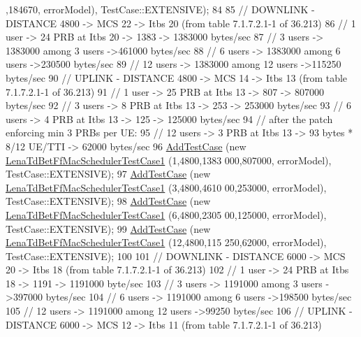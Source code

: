 \begin{DoxyCode}
      ,184670, errorModel), TestCase::EXTENSIVE);
84 
85   \textcolor{comment}{// DOWNLINK - DISTANCE 4800 -> MCS 22 -> Itbs 20 (from table 7.1.7.2.1-1 of 36.213)}
86   \textcolor{comment}{// 1 user -> 24 PRB at Itbs 20 -> 1383 -> 1383000 bytes/sec}
87   \textcolor{comment}{// 3 users -> 1383000 among 3 users ->461000  bytes/sec}
88   \textcolor{comment}{// 6 users -> 1383000 among 6 users ->230500  bytes/sec}
89   \textcolor{comment}{// 12 users -> 1383000 among 12 users ->115250  bytes/sec }
90   \textcolor{comment}{// UPLINK - DISTANCE 4800 -> MCS 14 -> Itbs 13 (from table 7.1.7.2.1-1 of 36.213)}
91   \textcolor{comment}{// 1 user -> 25 PRB at Itbs 13 -> 807 -> 807000 bytes/sec}
92   \textcolor{comment}{// 3 users -> 8 PRB at Itbs 13 -> 253 -> 253000 bytes/sec}
93   \textcolor{comment}{// 6 users -> 4 PRB at Itbs 13 -> 125 -> 125000 bytes/sec}
94   \textcolor{comment}{// after the patch enforcing min 3 PRBs per UE:}
95   \textcolor{comment}{// 12 users -> 3 PRB at Itbs 13 -> 93  bytes * 8/12 UE/TTI  -> 62000 bytes/sec}
96   \hyperlink{classns3_1_1TestCase_a3718088e3eefd5d6454569d2e0ddd835}{AddTestCase} (\textcolor{keyword}{new} \hyperlink{classLenaTdBetFfMacSchedulerTestCase1}{LenaTdBetFfMacSchedulerTestCase1} (1,4800,1383
      000,807000, errorModel), TestCase::EXTENSIVE);
97   \hyperlink{classns3_1_1TestCase_a3718088e3eefd5d6454569d2e0ddd835}{AddTestCase} (\textcolor{keyword}{new} \hyperlink{classLenaTdBetFfMacSchedulerTestCase1}{LenaTdBetFfMacSchedulerTestCase1} (3,4800,4610
      00,253000, errorModel), TestCase::EXTENSIVE);
98   \hyperlink{classns3_1_1TestCase_a3718088e3eefd5d6454569d2e0ddd835}{AddTestCase} (\textcolor{keyword}{new} \hyperlink{classLenaTdBetFfMacSchedulerTestCase1}{LenaTdBetFfMacSchedulerTestCase1} (6,4800,2305
      00,125000, errorModel), TestCase::EXTENSIVE);
99   \hyperlink{classns3_1_1TestCase_a3718088e3eefd5d6454569d2e0ddd835}{AddTestCase} (\textcolor{keyword}{new} \hyperlink{classLenaTdBetFfMacSchedulerTestCase1}{LenaTdBetFfMacSchedulerTestCase1} (12,4800,115
      250,62000, errorModel), TestCase::EXTENSIVE);
100 
101   \textcolor{comment}{// DOWNLINK - DISTANCE 6000 -> MCS 20 -> Itbs 18 (from table 7.1.7.2.1-1 of 36.213)}
102   \textcolor{comment}{// 1 user -> 24 PRB at Itbs 18 -> 1191 -> 1191000 byte/sec}
103   \textcolor{comment}{// 3 users -> 1191000 among 3 users ->397000  bytes/sec}
104   \textcolor{comment}{// 6 users -> 1191000 among 6 users ->198500  bytes/sec}
105   \textcolor{comment}{// 12 users -> 1191000 among 12 users ->99250  bytes/sec}
106   \textcolor{comment}{// UPLINK - DISTANCE 6000 -> MCS 12 -> Itbs 11 (from table 7.1.7.2.1-1 of 36.213)}

\end{DoxyCode}

